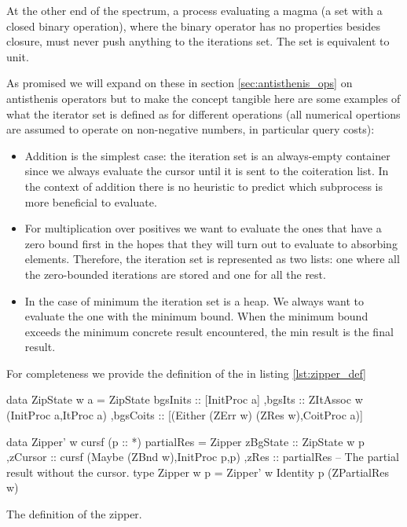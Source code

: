 At the other end of the spectrum, a process evaluating a magma (a set
with a closed binary operation), where the binary operator has no
properties besides closure, must never push anything to the iterations
set. The set is equivalent to unit.

As promised we will expand on these in section
\ref{sec:antisthenis_ops} on antisthenis operators but to make the
concept tangible here are some examples of what the iterator set is
defined as for different operations (all numerical opertions are
assumed to operate on non-negative numbers, in particular query
costs):

\begin{itemize}
\item Addition is the simplest case: the iteration set is an
  always-empty container since we always evaluate the cursor until it
  is sent to the coiteration list. In the context of addition there is
  no heuristic to predict which subprocess is more beneficial to
  evaluate.
\item For multiplication over positives we want to evaluate the ones
  that have a zero bound first in the hopes that they will turn out to
  evaluate to absorbing elements. Therefore, the iteration set is
  represented as two lists: one where all the zero-bounded iterations
  are stored and one for all the rest.
\item In the case of minimum the iteration set is a heap. We always
  want to evaluate the one with the minimum bound. When the minimum
  bound exceeds the minimum concrete result encountered, the min
  result is the final result.
\end{itemize}

For completeness we provide the definition of the  in
listing \ref{lst:zipper_def}

\begin{code}
\begin{haskellcode}
 data ZipState w a =
  ZipState
  { bgsInits :: [InitProc a]
   ,bgsIts :: ZItAssoc w (InitProc a,ItProc a)
   ,bgsCoits :: [(Either (ZErr w) (ZRes w),CoitProc a)]
  }

data Zipper' w cursf (p :: *) partialRes =
  Zipper
  { zBgState :: ZipState w p
   ,zCursor  :: cursf (Maybe (ZBnd w),InitProc p,p)
   ,zRes     :: partialRes -- The partial result without the cursor.
  }
type Zipper w p = Zipper' w Identity p (ZPartialRes w)
\end{haskellcode}
\label{lst:zipper_def}
\caption{The definition of the zipper.}
\end{code}

